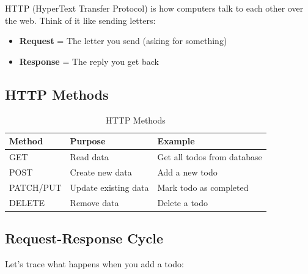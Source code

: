 \documentclass[12pt,a4paper]{article}
\begin{document}
HTTP (HyperText Transfer Protocol) is how computers talk to each other over the web. Think of it like sending letters:

\begin{itemize}
    \item \textbf{Request} = The letter you send (asking for something)
    \item \textbf{Response} = The reply you get back
\end{itemize}

\subsection{HTTP Methods}

\begin{table}[h]
\centering
\begin{tabular}{|l|l|p{6cm}|}
\hline
\textbf{Method} & \textbf{Purpose} & \textbf{Example} \\
\hline
GET & Read data & Get all todos from database \\
\hline
POST & Create new data & Add a new todo \\
\hline
PATCH/PUT & Update existing data & Mark todo as completed \\
\hline
DELETE & Remove data & Delete a todo \\
\hline
\end{tabular}
\caption{HTTP Methods}
\end{table}

\subsection{Request-Response Cycle}

Let's trace what happens when you add a todo:
\end{document}
